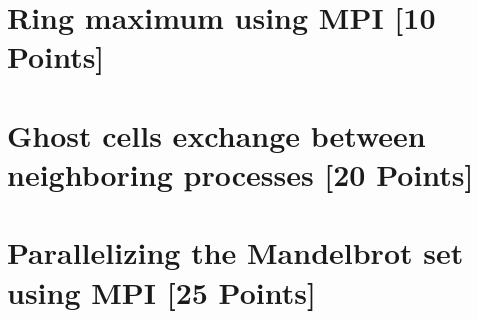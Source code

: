 \documentclass[unicode,11pt,a4paper,oneside,numbers=endperiod,openany]{scrartcl}
\begin{document}
\setassignment
{}

\newline

\assignmentpolicy


\section{Ring maximum using MPI [10 Points]}


\section{Ghost cells exchange between neighboring processes [20 Points]}


\section{Parallelizing the Mandelbrot set using MPI [25 Points]}



\end{document}
